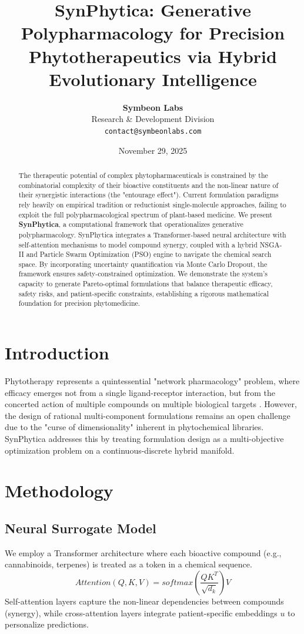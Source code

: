 \documentclass{article}
\title{\textbf{SynPhytica: Generative Polypharmacology for Precision Phytotherapeutics via Hybrid Evolutionary Intelligence}}
\author{\textbf{Symbeon Labs} \\ Research \& Development Division \\ \texttt{contact@symbeonlabs.com}}
\date{November 29, 2025}
\begin{document}
\maketitle

\begin{abstract}
The therapeutic potential of complex phytopharmaceuticals is constrained by the combinatorial complexity of their bioactive constituents and the non-linear nature of their synergistic interactions (the "entourage effect"). Current formulation paradigms rely heavily on empirical tradition or reductionist single-molecule approaches, failing to exploit the full polypharmacological spectrum of plant-based medicine. We present \textbf{SynPhytica}, a computational framework that operationalizes generative polypharmacology. SynPhytica integrates a Transformer-based neural architecture with self-attention mechanisms to model compound synergy, coupled with a hybrid NSGA-II and Particle Swarm Optimization (PSO) engine to navigate the chemical search space. By incorporating uncertainty quantification via Monte Carlo Dropout, the framework ensures safety-constrained optimization. We demonstrate the system's capacity to generate Pareto-optimal formulations that balance therapeutic efficacy, safety risks, and patient-specific constraints, establishing a rigorous mathematical foundation for precision phytomedicine.
\end{abstract}

\section{Introduction}
Phytotherapy represents a quintessential "network pharmacology" problem, where efficacy emerges not from a single ligand-receptor interaction, but from the concerted action of multiple compounds on multiple biological targets \cite{hopkins2008}. However, the design of rational multi-component formulations remains an open challenge due to the "curse of dimensionality" inherent in phytochemical libraries. SynPhytica addresses this by treating formulation design as a multi-objective optimization problem on a continuous-discrete hybrid manifold.

\section{Methodology}

\subsection{Neural Surrogate Model}
We employ a Transformer architecture where each bioactive compound (e.g., cannabinoids, terpenes) is treated as a token in a chemical sequence.
\begin{equation}
    Attention(Q, K, V) = softmax(\frac{QK^T}{\sqrt{d_k}})V
\end{equation}
Self-attention layers capture the non-linear dependencies between compounds (synergy), while cross-attention layers integrate patient-specific embeddings $u$ to personalize predictions.
\end{document}

